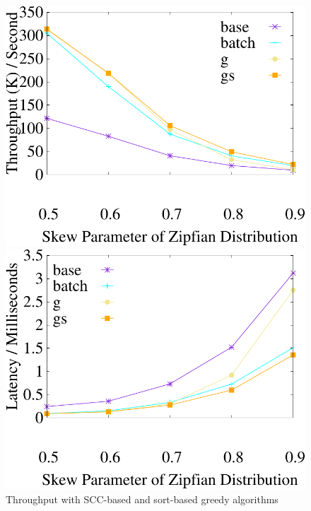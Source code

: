 \begin{figure}[t]
	\centering
    \begin{minipage}[b]{0.31\linewidth}
        \centering
        \includegraphics[width=\textwidth]{./exp_fig/greedy/tps}
        \caption{Throughput with SCC-based and sort-based greedy algorithms}
        \label{fig:greedy:tps}
    \end{minipage}
    \begin{minipage}[b]{0.31\linewidth}
	\centering
	\includegraphics[width=\textwidth]{./exp_fig/greedy/latency}

\end{minipage}
\end{figure}

